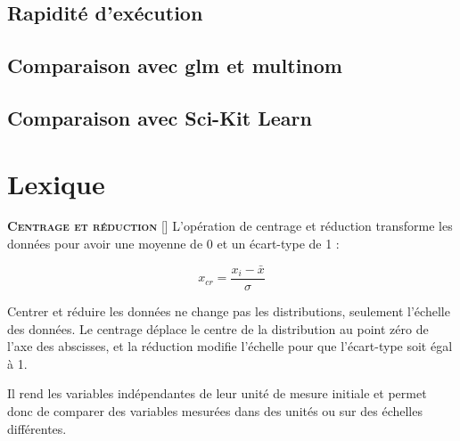 \documentclass[10pt,french]{report}
\newcommand{\entreelex}[3][]{%
	{\large \textbf{\textsc{#2}}} %
	\if\relax\detokenize{#1}\relax %
	\else %
	\raisebox{0.15ex}{\scalebox{0.7}{$\Diamond$}} %
	[#1] %
	\fi
	\raisebox{0.13ex}{\scalebox{0.75}{$\blacksquare$}} #3 %
}
\begin{document}
    \section{Rapidité d'exécution}

    \section{Comparaison avec glm et multinom}

    \section{Comparaison avec Sci-Kit Learn}

	\chapter{Lexique}

	\label{Centrage et réduction}
	\entreelex{Centrage et réduction}{L'opération de centrage et réduction transforme les données pour avoir une moyenne de 0 et un écart-type de 1 :

	\begin{equation}
		x_{cr}=\frac{x_{i}-\bar{x}}{\sigma}
	\end{equation}

	 Centrer et réduire les données ne change pas les distributions, seulement l'échelle des données. Le centrage déplace le centre de la distribution au point zéro de l'axe des abscisses, et la réduction modifie l'échelle pour que l'écart-type soit égal à 1.

	 Il rend les variables indépendantes de leur unité de mesure initiale et permet donc de comparer des variables mesurées dans des unités ou sur des échelles différentes.}
\end{document}
